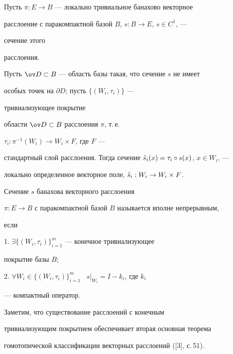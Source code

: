 Пусть $\pi:E\to B$ --- локально тривиальное банахово векторное 


расслоение с паракомпактной базой $B$, $s:B\to E$, $s\in C^1$, --- 


сечение этого 


расслоения. 


 


Пусть $\ov D\subset B$ --- область базы такая, что сечение $s$ не имеет 


особых точек на $\partial D$; пусть $\{(W_i,\tau_i)\}$ --- 


тривиализующее покрытие 


области $\ov D\subset B$ расслоения $\pi$, т.\,е. 


$\tau_i:\pi^{-1}(W_i)\to W_i\times F$, где $F$ --- 


стандартный слой расслоения. Тогда сечение $\Tilde s_i(x)=\tau_i\circ 


s(x)$, $x\in W_i$, --- 


локально определенное векторное поле, $\Tilde s_i:W_i\to W_i\times 


F$. 


 


\begin{defn} 


Сечение $s$ банахова векторного расслоения 


$\pi:E\to B$ с паракомпактной базой $B$ называется вполне непрерывным, 


если 


 


1. $\exists\{(W_i,\tau_i)\}^m_{i=1}$ --- конечное тривиализующее 


покрытие базы $B$; 


 


2. $\forall W_i\in\{(W_i,\tau_i)\}^m_{i=1}$ \ $s|_{W_i}=I-k_i$, где $k_i$ 


--- компактный оператор. 


\end{defn} 


 


 


Заметим, что существование расслоений с конечным 


тривиализующим покрытием обеспечивает вторая основная теорема 


гомотопической классификации векторных расслоений ([3], с.\,51). 


